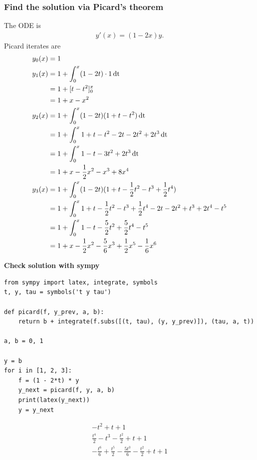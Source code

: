 \documentclass[12pt]{article}
\begin{document}
\subsubsection*{Find the solution via Picard's theorem}
The ODE is
\begin{align*}
  y'(x) = (1 - 2x)y.
\end{align*}
Picard iterates are
\begin{align*}
  y_0(x) &= 1\\
  y_1(x) &= 1 + \int_0^x (1 - 2t)\cdot 1 \operatorname{\text{dt}}\\
         &= 1 + [t - t^2]_0^x\\
         &= 1 + x - x^2\\
  y_2(x) &= 1 + \int_0^x (1 - 2t)(1 + t - t^2) \operatorname{\text{dt}}\\
         &= 1 + \int_0^x 1 + t - t^2 -2t -2t^2 + 2t^3 \operatorname{\text{dt}}\\
         &= 1 + \int_0^x 1 - t - 3t^2 + 2t^3 \operatorname{\text{dt}}\\
         &= 1 + x - \frac{1}{2}x^2 - x^3 + 8x^4\\
  y_3(x) &= 1 + \int_0^x (1 - 2t)(1 + t - \frac{1}{2}t^2 - t^3 + \frac{1}{2}t^4)\\
         &= 1 + \int_0^x 1 + t - \frac{1}{2}t^2 - t^3 + \frac{1}{2}t^4 - 2t - 2t^2 + t^3 + 2t^4 - t^5\\
         &= 1 + \int_0^x 1 - t - \frac{5}{2}t^2 + \frac{5}{2}t^4 - t^5\\
         &= 1 + x - \frac{1}{2}x^2 - \frac{5}{6}x^3 + \frac{1}{2}x^5 - \frac{1}{6}x^6
\end{align*}

\begin{mdframed}
\textbf{Check solution with sympy}
\begin{verbatim}
from sympy import latex, integrate, symbols
t, y, tau = symbols('t y tau')

def picard(f, y_prev, a, b):
    return b + integrate(f.subs([(t, tau), (y, y_prev)]), (tau, a, t))

a, b = 0, 1

y = b
for i in [1, 2, 3]:
    f = (1 - 2*t) * y
    y_next = picard(f, y, a, b)
    print(latex(y_next))
    y = y_next
\end{verbatim}
\begin{align*}
  - t^{2} + t + 1\\
  \frac{t^{4}}{2} - t^{3} - \frac{t^{2}}{2} + t + 1\\
  - \frac{t^{6}}{6} + \frac{t^{5}}{2} - \frac{5 t^{3}}{6} - \frac{t^{2}}{2} + t + 1\\
\end{align*}
\end{mdframed}
\end{document}
